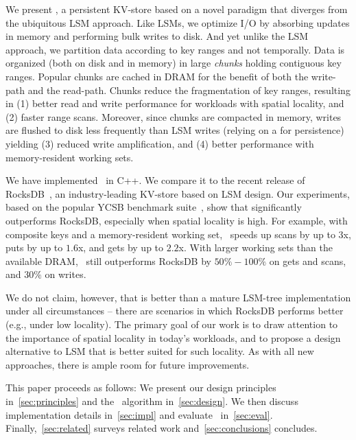 We present \sys, a persistent KV-store based on a novel paradigm that diverges from the ubiquitous LSM approach.  
Like  LSMs,  we optimize I/O by absorbing updates in memory and performing bulk writes to disk. 
And yet unlike the LSM approach, we partition data according to key ranges and not temporally.
Data is  organized (both on disk and in memory) in large \emph{chunks} holding contiguous key ranges.
Popular chunks are cached in DRAM for the benefit of  both the write-path and the read-path.
Chunks reduce the fragmentation of key ranges, resulting in 
(1) better read and write performance for workloads with spatial locality,  and
(2) faster range scans. 
Moreover, since chunks  are compacted in memory, writes are 
flushed to disk less frequently than LSM writes (relying on a {} for persistence)
yielding 
(3) reduced write amplification, and 
(4) better performance with memory-resident working sets.

{}

We have implemented \sys\ in C++. We compare it to the recent release of RocksDB~\cite{RocksDB}, 
an industry-leading KV-store  based on LSM design. Our experiments, based on the popular 
YCSB benchmark suite~\cite{YCSB}, show that \sys\/ significantly outperforms  RocksDB, 
especially when spatial  locality is high. 
For example, with composite keys and a memory-resident working set, \sys\  speeds up scans 
by up to 3x, puts by up to $1.6$x, and gets by up to $2.2$x. With larger working sets than the 
available DRAM, \sys\ still outperforms RocksDB by $50\% - 100\%$ on gets  and scans, 
and $30\%$ on writes. 

We do not claim, however, that \sys\/ is better than a mature LSM-tree implementation
under all circumstances -- there are scenarios in which RocksDB performs better (e.g., under low locality). 
The primary goal of our work is to draw attention to the importance of spatial locality in 
today's workloads, and to propose a design alternative to LSM that is better suited for such locality. 
As with all new approaches, there is ample  room for future improvements. 
 
 This paper proceeds as follows:
We present our design principles in~\cref{sec:principles} and  the \sys\ algorithm 
in~\cref{sec:design}. We then discuss implementation details in~\cref{sec:impl} and evaluate 
\sys\ in~\cref{sec:eval}.  Finally,~\cref{sec:related}   surveys related work and~\cref{sec:conclusions}
concludes. 
